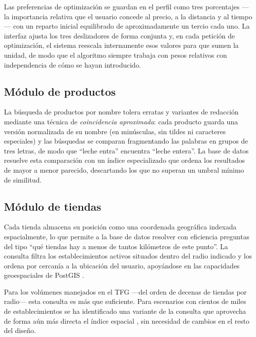 Las preferencias de optimizaci\'on se guardan en el perfil como tres porcentajes ---la importancia
relativa que el usuario concede al precio, a la distancia y al tiempo--- con un reparto inicial
equilibrado de aproximadamente un tercio cada uno. La interfaz ajusta los tres deslizadores de
forma conjunta y, en cada petici\'on de optimizaci\'on, el sistema reescala internamente esos
valores para que sumen la unidad, de modo que el algoritmo siempre trabaja con pesos relativos con
independencia de c\'omo se hayan introducido.

\subsection{M\'odulo de productos}\label{subsec:modelo-productos}

La b\'usqueda de productos por nombre tolera erratas y variantes de redacci\'on mediante una
t\'ecnica de \emph{coincidencia aproximada}: cada producto guarda una versi\'on normalizada de su
nombre (en min\'usculas, sin tildes ni caracteres especiales) y las b\'usquedas se comparan
fragmentando las palabras en grupos de tres letras, de modo que ``leche entra'' encuentra ``leche
entera''. La base de datos resuelve esta comparaci\'on con un \'indice especializado que ordena los
resultados de mayor a menor parecido, descartando los que no superan un umbral m\'inimo de
similitud.

\subsection{M\'odulo de tiendas}\label{subsec:modelo-tiendas}

Cada tienda almacena su posici\'on como una coordenada geogr\'afica indexada espacialmente, lo que
permite a la base de datos resolver con eficiencia preguntas del tipo ``qu\'e tiendas hay a menos de
tantos kil\'ometros de este punto''. La consulta filtra los establecimientos activos situados dentro
del radio indicado y los ordena por cercan\'ia a la ubicaci\'on del usuario, apoy\'andose en las
capacidades geoespaciales de PostGIS \cite{postgis_docs}.

Para los vol\'umenes manejados en el TFG ---del orden de decenas de tiendas por radio--- esta
consulta es m\'as que suficiente. Para escenarios con cientos de miles de establecimientos se ha
identificado una variante de la consulta que aprovecha de forma a\'un m\'as directa el \'indice
espacial \cite{postgis_in_action}, sin necesidad de cambios en el resto del dise\~no.

